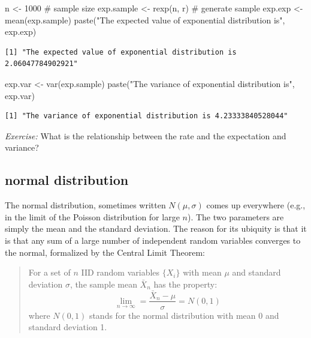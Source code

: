 \documentclass[
  letterpaper,
  DIV=11,
  numbers=noendperiod]{scrreprt}
\newenvironment{Shaded}{\begin{snugshade}}{\end{snugshade}}
\newcommand{\CommentTok}[1]{\textcolor[rgb]{0.37,0.37,0.37}{#1}}
\newcommand{\DecValTok}[1]{\textcolor[rgb]{0.68,0.00,0.00}{#1}}
\newcommand{\FunctionTok}[1]{\textcolor[rgb]{0.28,0.35,0.67}{#1}}
\newcommand{\NormalTok}[1]{\textcolor[rgb]{0.00,0.23,0.31}{#1}}
\newcommand{\OtherTok}[1]{\textcolor[rgb]{0.00,0.23,0.31}{#1}}
\newcommand{\StringTok}[1]{\textcolor[rgb]{0.13,0.47,0.30}{#1}}
\begin{document}
\begin{Shaded}
\begin{Highlighting}[]
\NormalTok{n }\OtherTok{\textless{}{-}} \DecValTok{1000} \CommentTok{\# sample size}
\NormalTok{exp.sample }\OtherTok{\textless{}{-}} \FunctionTok{rexp}\NormalTok{(n, r) }\CommentTok{\# generate sample}
\NormalTok{exp.exp }\OtherTok{\textless{}{-}} \FunctionTok{mean}\NormalTok{(exp.sample)}
\FunctionTok{paste}\NormalTok{(}\StringTok{"The expected value of exponential distribution is"}\NormalTok{, exp.exp)}
\end{Highlighting}
\end{Shaded}

\begin{verbatim}
[1] "The expected value of exponential distribution is 2.06047784902921"
\end{verbatim}

\begin{Shaded}
\begin{Highlighting}[]
\NormalTok{exp.var }\OtherTok{\textless{}{-}} \FunctionTok{var}\NormalTok{(exp.sample)}
\FunctionTok{paste}\NormalTok{(}\StringTok{"The variance of exponential distribution is"}\NormalTok{, exp.var)}
\end{Highlighting}
\end{Shaded}

\begin{verbatim}
[1] "The variance of exponential distribution is 4.23333840528044"
\end{verbatim}

\emph{Exercise:} What is the relationship between the rate and the
expectation and variance?

\hypertarget{normal-distribution}{%
\subsection{normal distribution}\label{normal-distribution}}

The normal distribution, sometimes written \(N(\mu, \sigma)\) comes up
everywhere (e.g., in the limit of the Poisson distribution for large
\(n\)). The two parameters are simply the mean and the standard
deviation. The reason for its ubiquity is that it is that any sum of a
large number of independent random variables converges to the normal,
formalized by the Central Limit Theorem:

\begin{quote}
For a set of \(n\) IID random variables \(\{X_i\}\) with mean \(\mu\)
and standard deviation \(\sigma\), the sample mean \(\bar X_n\) has the
property: \[
\lim_{n \to \infty} = \frac{\bar X_n - \mu}{\sigma} = N(0,1)
\] where \(N(0,1)\) stands for the normal distribution with mean 0 and
standard deviation 1.
\end{quote}
\end{document}
